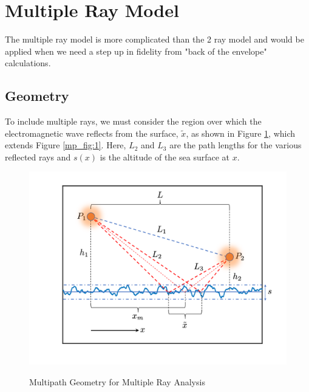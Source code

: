\section{Multiple Ray Model}
The multiple ray model is more complicated than the 2 ray model and would be applied when we need a step up in fidelity from "back of the envelope" calculations.

\subsection{Geometry}
To include multiple rays, we must consider the region over which the electromagnetic wave reflects from the surface, $\tilde{x}$, as shown in Figure \ref{mp_fig:2}, which extends Figure \ref{mp_fig:1}. Here, $L_2$ and $L_3$ are the path lengths for the various reflected rays and $s(x)$ is the altitude of the sea surface at $x$. 

\begin{figure}[H]
  \begin{center}
\includegraphics[width=5in]{../media/analysis/multipath_layout.png}
  \end{center}
  \renewcommand{\baselinestretch}{1} \small\normalsize
  \begin{quote}
    \caption[Multipath Geometry for Multiple Ray Analysis]{Multipath Geometry for Multiple Ray Analysis\label{mp_fig:2}}
  \end{quote}
\end{figure}
\renewcommand{\baselinestretch}{2} \small\normalsize

